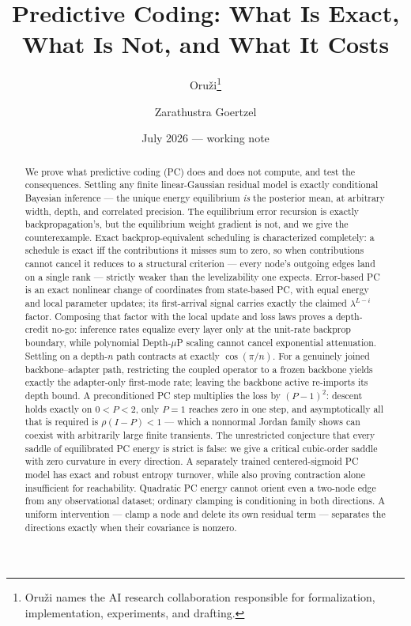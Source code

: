 \documentclass[11pt]{article}
\title{Predictive Coding: What Is Exact,\\ What Is Not, and What It Costs}
\author{Oru\v{z}i\thanks{Oru\v{z}i names the AI research collaboration responsible for
formalization, implementation, experiments, and drafting.} \and Zarathustra Goertzel}
\date{July 2026 --- working note}
\begin{document}
\maketitle

\begin{abstract}
We prove what predictive coding (PC) does and does not compute, and test the
consequences. Settling any finite linear-Gaussian residual model is exactly conditional
Bayesian inference --- the unique energy equilibrium \emph{is} the posterior mean, at
arbitrary width, depth, and correlated precision. The equilibrium error recursion is
exactly backpropagation's, but the equilibrium weight gradient is not, and we give the
counterexample. Exact backprop-equivalent scheduling is characterized completely: a
schedule is exact iff the contributions it misses sum to zero, so when contributions
cannot cancel it reduces to a structural criterion --- every node's outgoing edges land
on a single rank --- strictly weaker than the levelizability one expects. Error-based PC
is an exact nonlinear change of coordinates from state-based PC, with equal energy and
local parameter updates; its first-arrival signal carries exactly the claimed
$\lambda^{L-i}$ factor. Composing that factor with the local update and loss laws
proves a depth-credit no-go: inference rates equalize every layer only at the unit-rate
backprop boundary, while polynomial Depth-$\mu$P scaling cannot cancel exponential
attenuation. Settling on a depth-$n$ path contracts at exactly
$\cos(\pi/n)$.  For a genuinely joined backbone--adapter path, restricting the
coupled operator to a frozen backbone yields exactly the adapter-only first-mode rate;
leaving the backbone active re-imports its depth bound.  A preconditioned PC step
multiplies the loss by $(P-1)^2$: descent holds exactly on $0<P<2$, only $P=1$ reaches
zero in one step, and asymptotically all that is required is $\rho(I-P)<1$ --- which a
nonnormal Jordan family shows can coexist with arbitrarily large finite transients.
The unrestricted conjecture that every saddle of equilibrated PC energy is strict is
false: we give a critical cubic-order saddle with zero curvature in every direction.
A separately trained centered-sigmoid PC model has exact and robust entropy turnover,
while also proving contraction alone insufficient for reachability. Quadratic PC energy
cannot orient even a two-node edge from any observational dataset; ordinary clamping is
conditioning in both directions. A uniform intervention --- clamp a node and delete its
own residual term --- separates the directions exactly when their covariance is nonzero.

\end{abstract}
\end{document}
